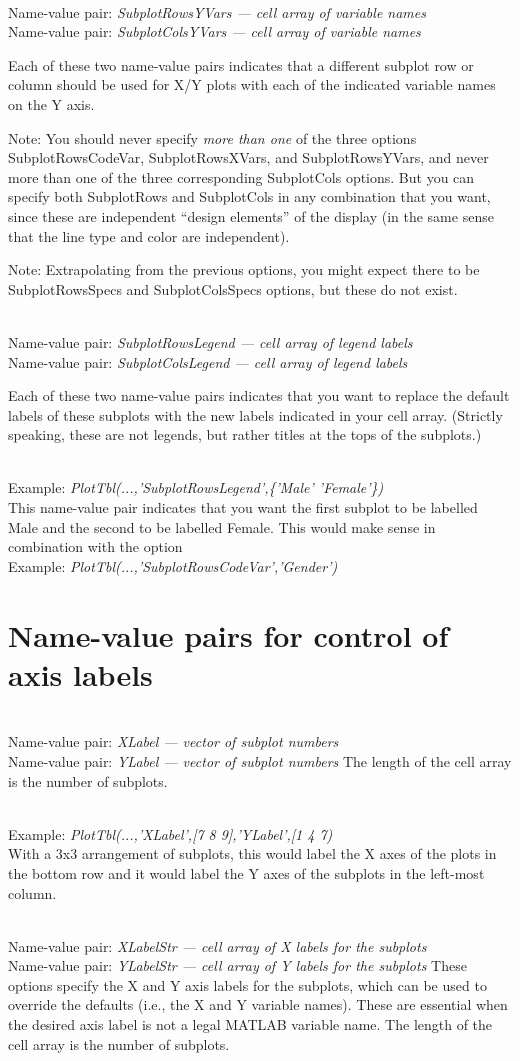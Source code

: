 \documentclass{article}
\newcommand{\example}[1]{\mbox{ } \\ Example: {\it #1} \\ }
\newcommand{\namevalue}[2]{\mbox{ } \\ Name-value pair: {\it #1 --- #2}}
\begin{document}
\namevalue{SubplotRowsYVars}{cell array of variable names}
\namevalue{SubplotColsYVars}{cell array of variable names}

Each of these two name-value pairs indicates that a different subplot row or column should
be used for X/Y plots with each of the indicated variable names on the Y axis.

Note: You should never specify \emph{more than one} of the three options
SubplotRowsCodeVar, SubplotRowsXVars, and SubplotRowsYVars,
and never more than one of the three corresponding SubplotCols options.
But you can specify both SubplotRows and SubplotCols in any
combination that you want, since these are independent ``design elements''
of the display (in the same sense that the line type and color are independent).

Note: Extrapolating from the previous options, you might expect there to be
SubplotRowsSpecs and SubplotColsSpecs options, but these do not exist.

\namevalue{SubplotRowsLegend}{cell array of legend labels}
\namevalue{SubplotColsLegend}{cell array of legend labels}

Each of these two name-value pairs indicates that you want to replace the default labels
of these subplots with the new labels indicated in your cell array.
(Strictly speaking, these are not legends, but rather titles at
the tops of the subplots.)

\example{PlotTbl(...,'SubplotRowsLegend',\{'Male' 'Female'\})}
This name-value pair indicates that you want the first subplot to be labelled Male
and the second to be labelled Female.
This would make sense in combination with the option
\example{PlotTbl(...,'SubplotRowsCodeVar','Gender')}

\section{Name-value pairs for control of axis labels}

\namevalue{XLabel}{vector of subplot numbers}
\namevalue{YLabel}{vector of subplot numbers}
The length of the cell array is the number of subplots.

\example{PlotTbl(...,'XLabel',[7 8 9],'YLabel',[1 4 7)}
With a 3x3 arrangement of subplots, this would label the X axes
of the plots in the bottom row and it would label the Y axes of
the subplots in the left-most column.

\namevalue{XLabelStr}{cell array of X labels for the subplots}
\namevalue{YLabelStr}{cell array of Y labels for the subplots}
These options specify the X and Y axis labels for the subplots, which can be used to
override the defaults (i.e., the X and Y variable names).
These are essential when the desired axis label is not a legal MATLAB variable name.
The length of the cell array is the number of subplots.
\end{document}
